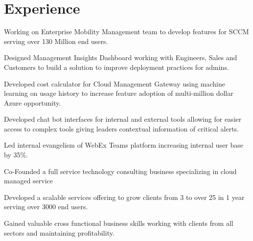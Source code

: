 \documentclass[]{deedy-resume-openfont}
\begin{document}
\hfill
\begin{minipage}[t]{0.66\textwidth} 


\section{Experience}

\vspace{\topsep} %
\begin{tightemize}
\item Working on Enterprise Mobility Management team to develop features for SCCM serving over 130 Million end users.
\item Designed Management Insights Dashboard working with Engineers, Sales and Customers to build a solution to improve deployment practices for admins.
\item Developed cost calculator for Cloud Management Gateway using machine learning on usage history to increase feature adoption of multi-million dollar Azure opportunity.
\end{tightemize}
\sectionsep

\vspace{\topsep} %
\begin{tightemize}
\item Developed chat bot interfaces for internal and external tools allowing for easier access to complex tools giving leaders contextual information of critical alerts.
\item Led internal evangelism of WebEx Teams platform increasing internal user base by 35\%.
\end{tightemize}
\sectionsep

\begin{tightemize}
\item Co-Founded a full service technology consulting business specializing in cloud managed service
\item Developed a scalable services offering to grow clients from 3 to over 25 in 1 year serving over 3000 end users.
\item Gained valuable cross functional business skills working with clients from all sectors and maintaining profitability.
\end{tightemize}
\sectionsep


\end{minipage}
\end{document}
